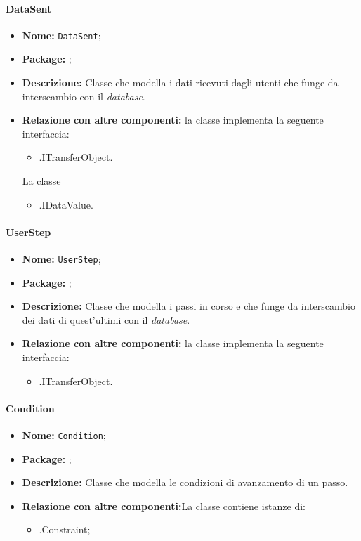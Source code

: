 \paragraph{DataSent}
\begin{itemize}
\item \textbf{Nome:} \texttt{DataSent};
\item \textbf{Package:} \texttt{\smodel{}};
\item \textbf{Descrizione:} Classe che modella i dati ricevuti dagli utenti che funge da interscambio  con il \textit{database}.
\item \textbf{Relazione con altre componenti:} la classe implementa la seguente interfaccia:
		\begin{itemize}
			\item \smodel{}.ITransferObject.
		\end{itemize}
				La classe 
		\begin{itemize}
			\item \smodel{}.IDataValue.
		\end{itemize}
\end{itemize}

\paragraph{UserStep}
\begin{itemize}
\item \textbf{Nome:} \texttt{UserStep};
\item \textbf{Package:} \texttt{\smodel{}};
\item \textbf{Descrizione:} Classe che modella i passi in corso e che funge da interscambio dei dati di quest'ultimi con il \textit{database}.
\item \textbf{Relazione con altre componenti:} la classe implementa la seguente interfaccia:
		\begin{itemize}
			\item \smodel{}.ITransferObject.
		\end{itemize}
\end{itemize}

\paragraph{Condition}
\begin{itemize}
\item \textbf{Nome:} \texttt{Condition};
\item \textbf{Package:} \texttt{\smodel{}};
\item \textbf{Descrizione:} Classe che modella le condizioni di avanzamento di un passo.
\item \textbf{Relazione con altre componenti:}La classe contiene istanze di:
		\begin{itemize}
			\item \smodel{}.Constraint;
		\end{itemize}
\end{itemize}

